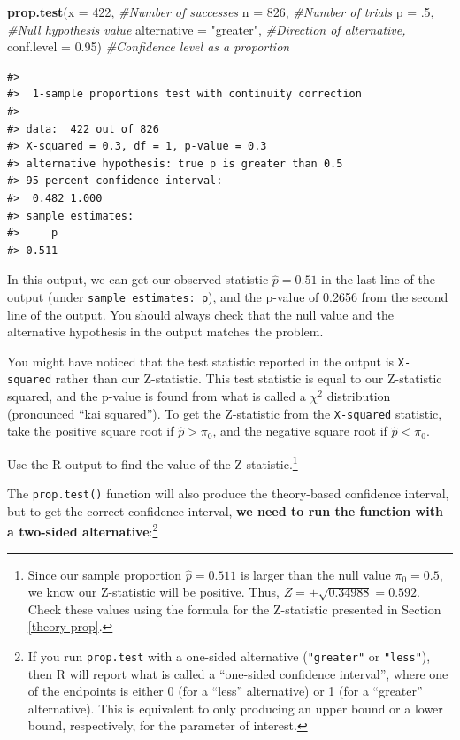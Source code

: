 \documentclass[
  10pt,
  openany]{book}
\newenvironment{Shaded}{\begin{snugshade}}{\end{snugshade}}
\newcommand{\AttributeTok}[1]{\textcolor[rgb]{0.13,0.29,0.53}{#1}}
\newcommand{\CommentTok}[1]{\textcolor[rgb]{0.56,0.35,0.01}{\textit{#1}}}
\newcommand{\DecValTok}[1]{\textcolor[rgb]{0.00,0.00,0.81}{#1}}
\newcommand{\FloatTok}[1]{\textcolor[rgb]{0.00,0.00,0.81}{#1}}
\newcommand{\FunctionTok}[1]{\textcolor[rgb]{0.13,0.29,0.53}{\textbf{#1}}}
\newcommand{\NormalTok}[1]{#1}
\newcommand{\StringTok}[1]{\textcolor[rgb]{0.31,0.60,0.02}{#1}}
\theoremstyle{definition}
\theoremstyle{definition}
\theoremstyle{definition}
\theoremstyle{definition}
\theoremstyle{remark}
\begin{document}
\begin{Shaded}
\begin{Highlighting}[]
\FunctionTok{prop.test}\NormalTok{(}\AttributeTok{x =} \DecValTok{422}\NormalTok{,  }\CommentTok{\#Number of successes}
          \AttributeTok{n =} \DecValTok{826}\NormalTok{, }\CommentTok{\#Number of trials}
          \AttributeTok{p =}\NormalTok{ .}\DecValTok{5}\NormalTok{, }\CommentTok{\#Null hypothesis value}
          \AttributeTok{alternative =} \StringTok{"greater"}\NormalTok{, }\CommentTok{\#Direction of alternative,}
          \AttributeTok{conf.level =} \FloatTok{0.95}\NormalTok{) }\CommentTok{\#Confidence level as a proportion}
\end{Highlighting}
\end{Shaded}

\begin{verbatim}
#> 
#>  1-sample proportions test with continuity correction
#> 
#> data:  422 out of 826
#> X-squared = 0.3, df = 1, p-value = 0.3
#> alternative hypothesis: true p is greater than 0.5
#> 95 percent confidence interval:
#>  0.482 1.000
#> sample estimates:
#>     p 
#> 0.511
\end{verbatim}

In this output, we can get our observed statistic \(\hat{p} = 0.51\) in the last line of the output (under \texttt{sample\ estimates:\ p}), and the p-value of 0.2656 from the second line of the output. You should always check that the null value and the alternative hypothesis in the output matches the problem.

You might have noticed that the test statistic reported in the output is \texttt{X-squared} rather than our Z-statistic. This test statistic is equal to our Z-statistic squared, and the p-value is found from what is called a \(\chi^2\) distribution (pronounced ``kai squared''). To get the Z-statistic from the \texttt{X-squared} statistic, take the positive square root if \(\hat{p} > \pi_0\), and the negative square root if \(\hat{p} < \pi_0\).

Use the R output to find the value of the Z-statistic.\footnote{Since our sample proportion \(\hat{p} = 0.511\) is larger than the null value \(\pi_0 = 0.5\), we know our Z-statistic will be positive. Thus, \(Z = +\sqrt{0.34988} = 0.592\). Check these values using the formula for the Z-statistic presented in Section \ref{theory-prop}.}

The \texttt{prop.test()} function will also produce the theory-based confidence interval, but to get the correct confidence interval, \textbf{we need to run the function with a two-sided alternative}:\footnote{If you run \texttt{prop.test} with a one-sided alternative (\texttt{"greater"} or \texttt{"less"}), then R will report what is called a ``one-sided confidence interval'', where one of the endpoints is either 0 (for a ``less'' alternative) or 1 (for a ``greater'' alternative). This is equivalent to only producing an upper bound or a lower bound, respectively, for the parameter of interest.}
\end{document}
